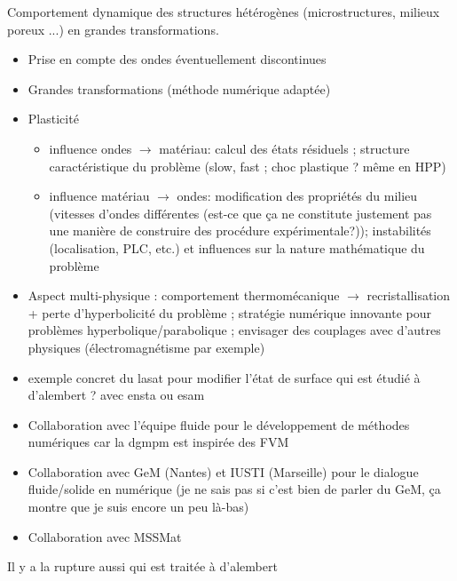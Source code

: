 Comportement dynamique des structures hétérogènes (microstructures, milieux poreux ...) en grandes transformations.

\begin{itemize}
\item Prise en compte des ondes éventuellement discontinues
\item Grandes transformations (méthode numérique adaptée)
\item Plasticité
  \begin{itemize}
  \item influence ondes $\rightarrow$ matériau: calcul des états résiduels ; structure caractéristique du problème (slow, fast ; choc plastique ? même en HPP)
  \item influence matériau $\rightarrow$ ondes: modification des propriétés du milieu (vitesses d'ondes différentes (est-ce que ça ne constitute justement pas une manière de construire des procédure expérimentale?)); instabilités (localisation, PLC, etc.) et influences sur la nature mathématique du problème
  \end{itemize}
\item Aspect multi-physique : comportement thermomécanique $\rightarrow$ recristallisation + perte d'hyperbolicité du problème ; stratégie numérique innovante pour problèmes hyperbolique/parabolique ; envisager des couplages avec d'autres physiques (électromagnétisme par exemple)
\item exemple concret du lasat pour modifier l'état de surface qui est étudié à d'alembert ? avec ensta ou esam
\item Collaboration avec l'équipe fluide pour le développement de méthodes numériques car la dgmpm est inspirée des FVM
\item Collaboration avec GeM (Nantes) et IUSTI (Marseille) pour le dialogue fluide/solide en numérique (je ne sais pas si c'est bien de parler du GeM, ça montre que je suis encore un peu là-bas)
\item Collaboration avec MSSMat
\end{itemize}

Il y a la rupture aussi qui est traitée à d'alembert


